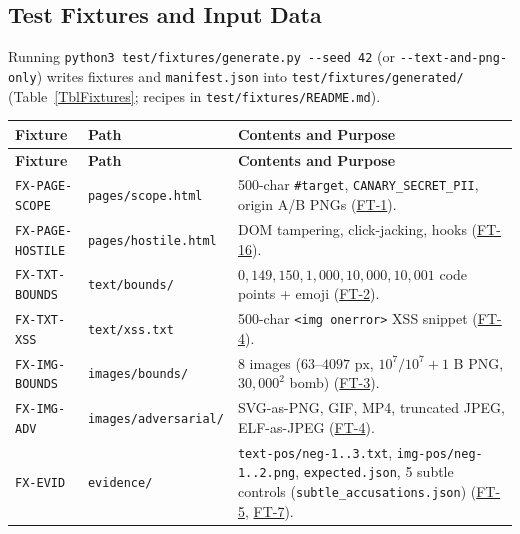 \documentclass[12pt, titlepage]{article}
\begin{document}
\subsection{Test Fixtures and Input Data}\label{subsec:fixtures}

Running \texttt{python3 test/\allowbreak{}fixtures/\allowbreak{}generate.py -{}-seed 42} (or \texttt{-{}-text-and-png-only}) writes fixtures and \texttt{manifest.json} into \texttt{test/\allowbreak{}fixtures/\allowbreak{}generated/} (Table~\ref{TblFixtures}; recipes in \texttt{test/\allowbreak{}fixtures/\allowbreak{}README.md}).

\begingroup\small
\renewcommand{\arraystretch}{0.95}
\setlength{\tabcolsep}{4pt}
\begin{tabularx}{\textwidth}{Q{2.9cm} Q{3.1cm} Y}
\caption{Test Fixture Inventory} \label{TblFixtures}\\
\toprule
\textbf{Fixture} & \textbf{Path} & \textbf{Contents and Purpose}\\
\midrule
\endfirsthead
\toprule
\textbf{Fixture} & \textbf{Path} & \textbf{Contents and Purpose}\\
\midrule
\endhead
\bottomrule
\endfoot
\texttt{FX-PAGE-SCOPE} & \texttt{pages/\allowbreak{}scope.html} & 500-char \texttt{\#target}, \texttt{CANARY\_\allowbreak{}SECRET\_\allowbreak{}PII}, origin A/B PNGs (\hyperref[test:FT-1]{FT-1}).\\
\texttt{FX-PAGE-HOSTILE} & \texttt{pages/\allowbreak{}hostile.html} & DOM tampering, click-jacking, hooks (\hyperref[test:FT-16]{FT-16}).\\
\texttt{FX-TXT-BOUNDS} & \texttt{text/\allowbreak{}bounds/} & $0, 149, 150, 1{,}000, 10{,}000, 10{,}001$ code points + emoji (\hyperref[test:FT-2]{FT-2}).\\
\texttt{FX-TXT-XSS} & \texttt{text/\allowbreak{}xss.txt} & 500-char \texttt{<img onerror>} XSS snippet (\hyperref[test:FT-4]{FT-4}).\\
\texttt{FX-IMG-BOUNDS} & \texttt{images/\allowbreak{}bounds/} & 8 images ($63$--$4097\text{ px}$, $10^7/10^7+1$ B PNG, $30{,}000^2$ bomb) (\hyperref[test:FT-3]{FT-3}).\\
\texttt{FX-IMG-ADV} & \texttt{images/\allowbreak{}adversarial/} & SVG-as-PNG, GIF, MP4, truncated JPEG, ELF-as-JPEG (\hyperref[test:FT-4]{FT-4}).\\
\texttt{FX-EVID} & \texttt{evidence/} & \texttt{text-pos/neg-1..3.txt}, \texttt{img-pos/neg-1..2.png}, \texttt{expected.json}, 5 subtle controls (\texttt{subtle\_\allowbreak{}accusations.json}) (\hyperref[test:FT-5]{FT-5}, \hyperref[test:FT-7]{FT-7}).\\

\end{tabularx}
\end{document}
